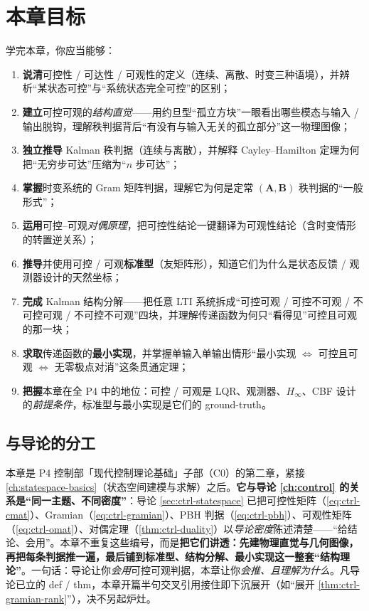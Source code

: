 \section*{本章目标}
学完本章，你应当能够：
\begin{enumerate}
  \item \textbf{说清}可控性 / 可达性 / 可观性的定义（连续、离散、时变三种语境），并辨析“某状态可控”与“系统状态完全可控”的区别；
  \item \textbf{建立}可控可观的\emph{结构直觉}——用约旦型“孤立方块”一眼看出哪些模态与输入 / 输出脱钩，理解秩判据背后“有没有与输入无关的孤立部分”这一物理图像；
  \item \textbf{独立推导} Kalman 秩判据（连续与离散），并解释 Cayley--Hamilton 定理为何把“无穷步可达”压缩为“$n$ 步可达”；
  \item \textbf{掌握}时变系统的 Gram 矩阵判据，理解它为何是定常 $(\mathbf{A},\mathbf{B})$ 秩判据的“一般形式”；
  \item \textbf{运用}可控--可观\emph{对偶原理}，把可控性结论一键翻译为可观性结论（含时变情形的转置逆关系）；
  \item \textbf{推导}并使用可控 / 可观\textbf{标准型}（友矩阵形），知道它们为什么是状态反馈 / 观测器设计的天然坐标；
  \item \textbf{完成} Kalman 结构分解——把任意 LTI 系统拆成“可控可观 / 可控不可观 / 不可控可观 / 不可控不可观”四块，并理解传递函数为何只“看得见”可控且可观的那一块；
  \item \textbf{求取}传递函数的\textbf{最小实现}，并掌握单输入单输出情形“最小实现 $\iff$ 可控且可观 $\iff$ 无零极点对消”这条贯通定理；
  \item \textbf{把握}本章在全 P4 中的地位：可控 / 可观是 LQR、观测器、$H_\infty$、CBF 设计的\emph{前提条件}，标准型与最小实现是它们的 ground-truth。
\end{enumerate}

\subsection*{与导论的分工}
本章是 P4 控制部「现代控制理论基础」子部（C0）的第二章，紧接 \cref{ch:statespace-basics}（状态空间建模与求解）之后。\textbf{它与导论 \cref{ch:control} 的关系是“同一主题、不同密度”}：导论 \cref{sec:ctrl-statespace} 已把可控性矩阵（\cref{eq:ctrl-cmat}）、Gramian（\cref{eq:ctrl-gramian}）、PBH 判据（\cref{eq:ctrl-pbh}）、可观性矩阵（\cref{eq:ctrl-omat}）、对偶定理（\cref{thm:ctrl-duality}）以\emph{导论密度}陈述清楚——“给结论、会用”。本章不重复这些编号，而是\textbf{把它们讲透：先建物理直觉与几何图像，再把每条判据推一遍，最后铺到标准型、结构分解、最小实现这一整套“结构理论”}。一句话：导论让你\emph{会用}可控可观判据，本章让你\emph{会推、且理解为什么}。凡导论已立的 def / thm，本章开篇半句交叉引用接住即下沉展开（如“展开 \cref{thm:ctrl-gramian-rank}”），决不另起炉灶。

